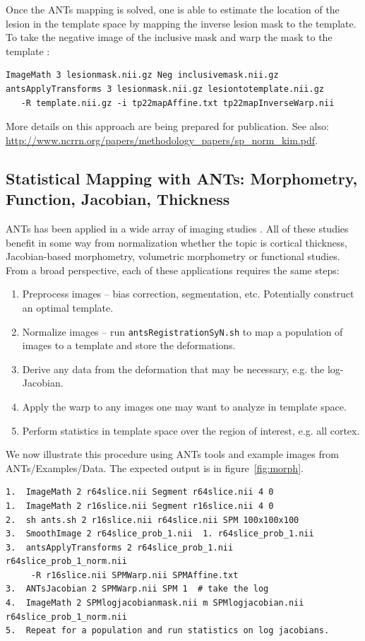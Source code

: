 \documentclass{InsightArticle}
\begin{document}
Once the ANTs mapping is solved, 
one is able to estimate the location of the lesion in the template space by mapping the inverse lesion mask to the template.
To take the negative image of the inclusive mask 
and warp the mask to the template :
\begin{verbatim}
ImageMath 3 lesionmask.nii.gz Neg inclusivemask.nii.gz
antsApplyTransforms 3 lesionmask.nii.gz lesiontotemplate.nii.gz 
   -R template.nii.gz -i tp22mapAffine.txt tp22mapInverseWarp.nii
\end{verbatim}
More details on this approach are being prepared for publication.
See also: \href{http://www.ncrrn.org/papers/methodology\_papers/sp\_norm\_kim.pdf}{http://www.ncrrn.org/papers/methodology\_papers/sp\_norm\_kim.pdf}.

\subsection{Statistical Mapping with ANTs: Morphometry, Function, Jacobian, Thickness}
ANTs has been applied in a wide array of imaging studies
\cite{Avants2009a,Avants2009b,Avants2009,Das2009,Klein2009,Massimo2009,Pluta2008,Tustison2009,Yushkevich2009,Avants2008c,Avants2008b,M.Grossman10282008,Kim2008,Simon2008,Sun2008,Yushkevich2008,Aguirre2007,Avants2007,Avants2007i}.
All of these studies benefit in some way from normalization whether the topic is cortical
thickness, Jacobian-based morphometry, volumetric morphometry or functional studies. 
From a broad perspective, each of these applications requires the same steps:
\begin{enumerate}
\item Preprocess images -- bias correction, segmentation, etc.  Potentially construct an optimal template. 
\item Normalize images -- run \texttt{antsRegistrationSyN.sh} to map a population of images to a template and store the deformations. 
\item Derive any data from the deformation that may be necessary, e.g. the log-Jacobian.
\item Apply the warp to any images one may want to analyze in template space.  
\item Perform statistics in template space over the region of interest, e.g. all cortex. 
\end{enumerate}
We now illustrate this procedure using ANTs tools and example images from ANTs/Examples/Data. 
The expected output is in figure~\ref{fig:morph}.
\begin{verbatim}
1.  ImageMath 2 r64slice.nii Segment r64slice.nii 4 0
1.  ImageMath 2 r16slice.nii Segment r16slice.nii 4 0
2.  sh ants.sh 2 r16slice.nii r64slice.nii SPM 100x100x100
3.  SmoothImage 2 r64slice_prob_1.nii  1. r64slice_prob_1.nii  
3.  antsApplyTransforms 2 r64slice_prob_1.nii  r64slice_prob_1_norm.nii
     -R r16slice.nii SPMWarp.nii SPMAffine.txt 
3.  ANTsJacobian 2 SPMWarp.nii SPM 1  # take the log
4.  ImageMath 2 SPMlogjacobianmask.nii m SPMlogjacobian.nii r64slice_prob_1_norm.nii
5.  Repeat for a population and run statistics on log jacobians.
\end{verbatim}
\end{document}
